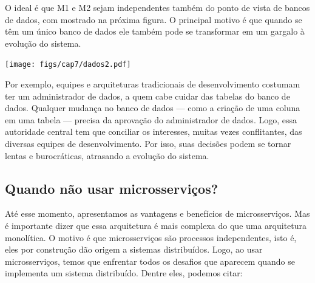 \documentclass[
  11pt,
  twoside]{book}
\begin{document}
O ideal é que M1 e M2 sejam independentes também do ponto de vista de
bancos de dados, com mostrado na próxima figura. O principal motivo é
que quando se têm um único banco de dados ele também pode se transformar
em um gargalo à evolução do sistema.

\begin{center}

\texttt{[image: figs/cap7/dados2.pdf]}

\end{center}

Por exemplo, equipes e arquiteturas tradicionais de desenvolvimento
costumam ter um administrador de dados, a quem cabe cuidar das tabelas
do banco de dados. Qualquer mudança no banco de dados --- como a criação
de uma coluna em uma tabela --- precisa da aprovação do administrador de
dados. Logo, essa autoridade central tem que conciliar os interesses,
muitas vezes conflitantes, das diversas equipes de desenvolvimento. Por
isso, suas decisões podem se tornar lentas e burocráticas, atrasando a
evolução do sistema.

\hypertarget{quando-nuxe3o-usar-microsserviuxe7os}{%
\subsection{Quando não usar
microsserviços?}\label{quando-nuxe3o-usar-microsserviuxe7os}}


Até esse momento, apresentamos as vantagens e benefícios de
microsserviços. Mas é importante dizer que essa arquitetura é mais
complexa do que uma arquitetura monolítica. O motivo é que
microsserviços são processos independentes, isto é, eles por construção
dão origem a sistemas distribuídos. Logo, ao usar microsserviços, temos
que enfrentar todos os desafios que aparecem quando se implementa um
sistema distribuído. Dentre eles, podemos citar:
\end{document}
